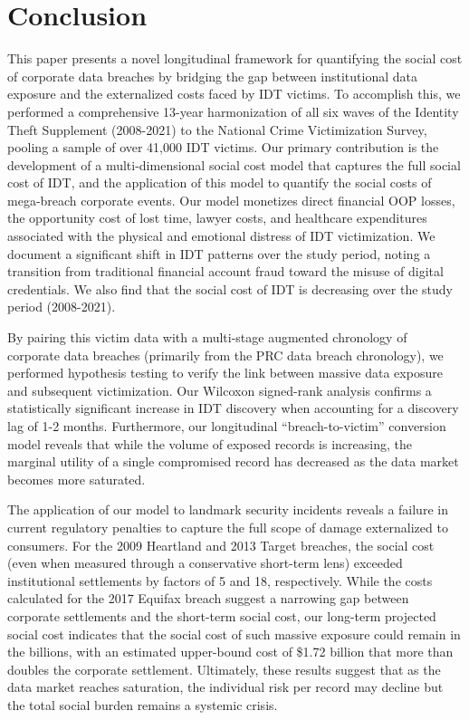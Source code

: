 
\section{Conclusion}
\label{sec:conclusion}
This paper presents a novel longitudinal framework for quantifying the social cost of corporate data breaches by bridging the gap between institutional data exposure and the externalized costs faced by IDT victims.
To accomplish this, we performed a comprehensive 13-year harmonization of all six waves of the Identity Theft Supplement (2008-2021) to the National Crime Victimization Survey, pooling a sample of over 41,000 IDT victims. Our primary contribution is the development of a multi-dimensional social cost model that captures the full social cost of IDT, and the application of this model to quantify the social costs of mega-breach corporate events. Our model monetizes direct financial OOP losses, the opportunity cost of lost time, lawyer costs, and healthcare expenditures associated with the physical and emotional distress of IDT victimization. We document a significant shift in IDT patterns over the study period, noting a transition from traditional financial account fraud toward the misuse of digital credentials. We also find that the social cost of IDT is decreasing over the study period (2008-2021). 

By pairing this victim data with a multi-stage augmented chronology of corporate data breaches (primarily from the PRC data breach chronology), we performed hypothesis testing to verify the link between massive data exposure and subsequent victimization. Our Wilcoxon signed-rank analysis confirms a statistically significant increase in IDT discovery when accounting for a discovery lag of 1-2 months. Furthermore, our longitudinal ``breach-to-victim'' conversion model reveals that while the volume of exposed records is increasing, the marginal utility of a single compromised record has decreased as the data market becomes more saturated. 

The application of our model to landmark security incidents reveals a failure in current regulatory penalties to capture the full scope of damage externalized to consumers. For the 2009 Heartland and 2013 Target breaches, the social cost (even when measured through a conservative short-term lens) exceeded institutional settlements by factors of 5 and 18, respectively. While the costs calculated for the 2017 Equifax breach suggest a narrowing gap between corporate settlements and the short-term social cost, our long-term projected social cost indicates that the social cost of such massive exposure could remain in the billions, with an estimated upper-bound cost of \$1.72 billion that more than doubles the corporate settlement. Ultimately, these results suggest that as the data market reaches saturation, the individual risk per record may decline but the total social burden remains a systemic crisis.


